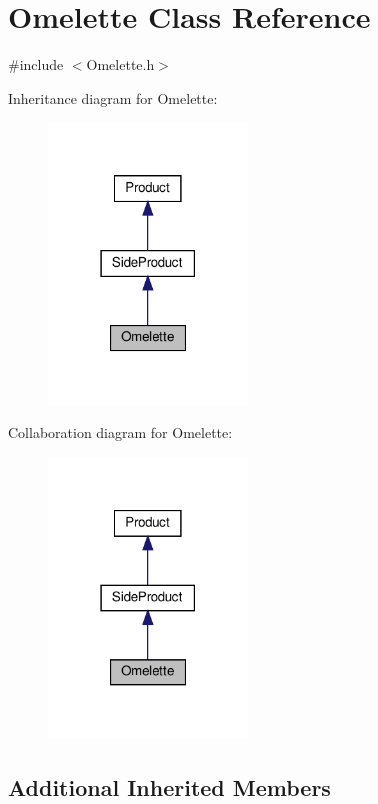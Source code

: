 \hypertarget{classOmelette}{}\section{Omelette Class Reference}
\label{classOmelette}


{\ttfamily \#include $<$Omelette.\+h$>$}



Inheritance diagram for Omelette\+:
\nopagebreak
\begin{figure}[H]
\begin{center}
\leavevmode
\includegraphics[width=150pt]{classOmelette__inherit__graph}
\end{center}
\end{figure}


Collaboration diagram for Omelette\+:
\nopagebreak
\begin{figure}[H]
\begin{center}
\leavevmode
\includegraphics[width=150pt]{classOmelette__coll__graph}
\end{center}
\end{figure}
\subsection*{Additional Inherited Members}


